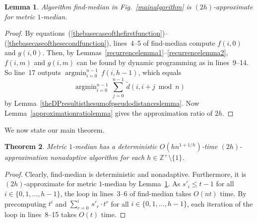 \documentclass[letterpaper,12pt]{article}
\newtheorem{theorem}{Theorem}
\newtheorem{lemma}[theorem]{Lemma}
\newcommand{\comment}[1]{}
\begin{document}
\comment{ Lemmas~\ref{recurrencelemma1}--\ref{recurrencelemma2}
allow us to compute
$f(\cdot)$
by dynamic programming.
}
\begin{lemma}
\label{algorithmapproximationratiolemma}
Algorithm {\sf find-median} in Fig.~\ref{mainalgorithm}
is $(2h)$-approximate for {\sc metric $1$-median}.
\end{lemma}
\begin{proof}
By
equations~(\ref{thebasecaseofthefirstfunction})--(\ref{thebasecaseofthesecondfunction}),
lines~4--5 of {\sf find-median}
compute $f(i,0)$
and $g(i,0)$.
Then, by Lemmas~\ref{recurrencelemma1}--\ref{recurrencelemma2},
$f(i,m)$
and $g(i,m)$
can be found by dynamic programming as in lines~9--14.
So line~17 outputs
$\mathop{\mathrm{argmin}}_{i=0}^{n-1}\,f(i,h-1)$,
which equals
$$\mathop{\mathrm{argmin}}_{i=0}^{n-1}\,\sum_{j=0}^{n-1}\,
\tilde{d}\left(i,i+j\bmod{n}\right)$$
by Lemma~\ref{theDPresultisthesumofpseudodistanceslemma}.
Now Lemma~\ref{approximationratiolemma}
gives the approximation ratio of $2h$.
\end{proof}

We now state our main theorem.

\begin{theorem}
{\sc Metric $1$-median} has a
deterministic
$O(h n^{1+1/h})$-time
$(2h)$-approximation
nonadaptive
algorithm for each
$h\in\mathbb{Z}^+\setminus\{1\}$.
\end{theorem}
\begin{proof}
Clearly, {\sf find-median} is deterministic and nonadaptive.
Furthermore, it is $(2h)$-approximate for {\sc metric $1$-median}
by Lemma~\ref{algorithmapproximationratiolemma}.
As $s'_i\le t-1$ for all $i\in\{0,1,\ldots,h-1\}$,
the loop in lines~3--6 of {\sf find-median} takes $O(nt)$ time.
By precomputing $t^i$ and $\sum_{r=0}^i\, s'_r\cdot t^r$ for all
$i\in\{0,1,\ldots,h-1\}$, each iteration of the loop in lines~8--15
takes $O(t)$ time.
\end{proof}
\end{document}
